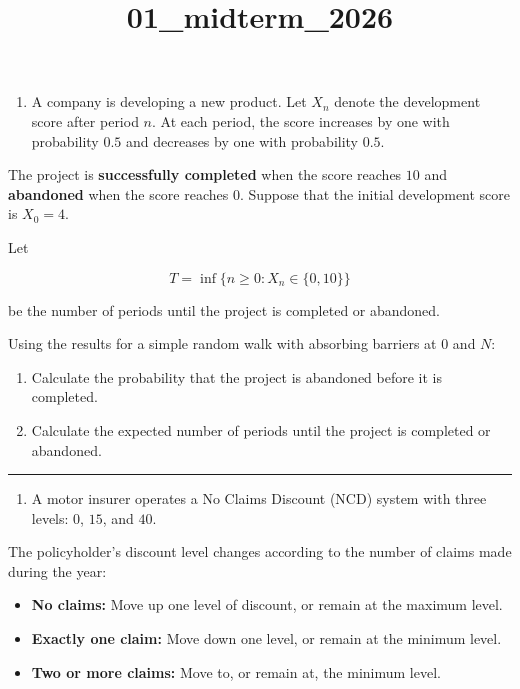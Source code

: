\documentclass[
  letterpaper,
  DIV=11,
  numbers=noendperiod]{scrartcl}
\title{01\_midterm\_2026}
\author{}
\date{}
\providecommand{\tightlist}{%
  \setlength{\itemsep}{0pt}\setlength{\parskip}{0pt}}
\begin{document}
\maketitle


\begin{enumerate}
\def\labelenumi{\arabic{enumi}.}
\tightlist
\item
  A company is developing a new product. Let \(X_n\) denote the
  development score after period \(n\). At each period, the score
  increases by one with probability \(0.5\) and decreases by one with
  probability \(0.5\).
\end{enumerate}

The project is \textbf{successfully completed} when the score reaches
\(10\) and \textbf{abandoned} when the score reaches \(0\). Suppose that
the initial development score is \(X_0=4\).

Let

\[
T=\inf\{n\geq0:X_n\in\{0,10\}\}
\]

be the number of periods until the project is completed or abandoned.

Using the results for a simple random walk with absorbing barriers at
\(0\) and \(N\):

\begin{enumerate}
\def\labelenumi{\arabic{enumi}.}
\item
  Calculate the probability that the project is abandoned before it is
  completed.
\item
  Calculate the expected number of periods until the project is
  completed or abandoned.
\end{enumerate}

\begin{center}\rule{0.5\linewidth}{0.5pt}\end{center}

\begin{enumerate}
\def\labelenumi{\arabic{enumi}.}
\setcounter{enumi}{1}
\tightlist
\item
  A motor insurer operates a No Claims Discount (NCD) system with three
  levels: \(0%
  \), \(15%
  \), and \(40%
  \).
\end{enumerate}

The policyholder's discount level changes according to the number of
claims made during the year:

\begin{itemize}
\tightlist
\item
  \textbf{No claims:} Move up one level of discount, or remain at the
  maximum level.
\item
  \textbf{Exactly one claim:} Move down one level, or remain at the
  minimum level.
\item
  \textbf{Two or more claims:} Move to, or remain at, the minimum level.
\end{itemize}
\end{document}
